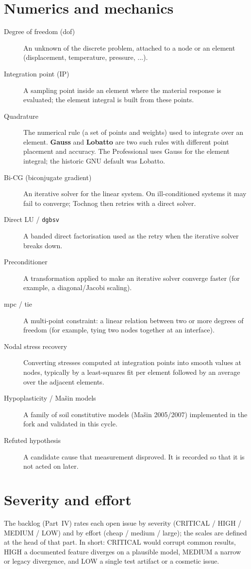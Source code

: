 \documentclass[11pt,a4paper]{report}
\newcommand{\code}[1]{\texttt{#1}}
\begin{document}
\section*{Numerics and mechanics}
\begin{description}
  \item[Degree of freedom (dof)] An unknown of the discrete problem, attached
        to a node or an element (displacement, temperature, pressure, ...).
  \item[Integration point (IP)] A sampling point inside an element where the
        material response is evaluated; the element integral is built from
        these points.
  \item[Quadrature] The numerical rule (a set of points and weights) used to
        integrate over an element. \textbf{Gauss} and \textbf{Lobatto} are two
        such rules with different point placement and accuracy. The
        Professional uses Gauss for the element integral; the historic GNU
        default was Lobatto.
  \item[Bi-CG (biconjugate gradient)] An iterative solver for the linear
        system. On ill-conditioned systems it may fail to converge; Tochnog
        then retries with a direct solver.
  \item[Direct LU / \code{dgbsv}] A banded direct factorisation used as the
        retry when the iterative solver breaks down.
  \item[Preconditioner] A transformation applied to make an iterative solver
        converge faster (for example, a diagonal/Jacobi scaling).
  \item[mpc / tie] A multi-point constraint: a linear relation between two or
        more degrees of freedom (for example, tying two nodes together at an
        interface).
  \item[Nodal stress recovery] Converting stresses computed at integration
        points into smooth values at nodes, typically by a least-squares fit
        per element followed by an average over the adjacent elements.
  \item[Hypoplasticity / Ma\v{s}in models] A family of soil constitutive models
        (Ma\v{s}in 2005/2007) implemented in the fork and validated in this
        cycle.
  \item[Refuted hypothesis] A candidate cause that measurement disproved. It is
        recorded so that it is not acted on later.
\end{description}

\section*{Severity and effort}
The backlog (Part~IV) rates each open issue by severity
(CRITICAL / HIGH / MEDIUM / LOW) and by effort (cheap / medium / large); the
scales are defined at the head of that part. In short: CRITICAL would corrupt
common results, HIGH a documented feature diverges on a plausible model, MEDIUM
a narrow or legacy divergence, and LOW a single test artifact or a cosmetic
issue.
\end{document}
